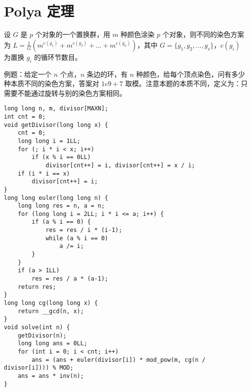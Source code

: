 \section{Polya 定理}

设 $G$ 是 $p$ 个对象的一个置换群，用 $m$ 种颜色涂染 $p$ 个对象，则不同的染色方案为 $L = \frac{1}{G}(m^{c(g_1)} + m^{c(g_2)} + ... +m^{c(g_n)})$，其中 $G = \{g_1, g_2, ..., g_s\}$，$c(g_i)$ 为置换 $g_i$ 的循环节数目。

\par 例题：给定一个 $n$ 个点，$n$ 条边的环，有 $n$ 种颜色，给每个顶点染色，问有多少种本质不同的染色方案，答案对 $1e9+7$ 取模。注意本题的本质不同，定义为：只需要不能通过旋转与别的染色方案相同。

\begin{verbatim}
long long n, m, divisor[MAXN];
int cnt = 0;
void getDivisor(long long x) {
    cnt = 0;
    long long i = 1LL;
    for (; i * i < x; i++)
        if (x % i == 0LL)
            divisor[cnt++] = i, divisor[cnt++] = x / i;
    if (i * i == x)
        divisor[cnt++] = i;
}
long long euler(long long n) {
    long long res = n, a = n;
    for (long long i = 2LL; i * i <= a; i++) {
        if (a % i == 0) {
            res = res / i * (i-1);
            while (a % i == 0)
                a /= i;
        }
    }
    if (a > 1LL)
        res = res / a * (a-1);
    return res;
}
long long cg(long long x) {
    return __gcd(n, x);
}
void solve(int n) {
    getDivisor(n);
    long long ans = 0LL;
    for (int i = 0; i < cnt; i++)
        ans = (ans + euler(divisor[i]) * mod_pow(m, cg(n / divisor[i]))) % MOD;
    ans = ans * inv(n);
}
\end{verbatim}
